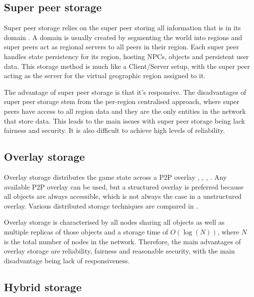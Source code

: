 \documentclass[10pt,a4paper,conference]{IEEEtran}
\begin{document}
\subsection{Super peer storage}

Super peer storage relies on the super peer storing all information that is in its domain \cite{knutsson_p2p_first}. A domain is usually created by
segmenting the world into regions and super peers act as regional servers to all peers in their region. Each super peer handles state persistency for
its region, hosting NPCs, objects and persistent user data. This storage method is much like a Client/Server setup, with the super peer acting as the
server for the virtual geographic region assigned to it.

The advantage of super peer storage is that it's responsive. The disadvantages of super peer storage stem from the per-region centralised approach,
where super peers have access to all region data and they are the only entities in the network that store data. This leads to the main issues with
super peer storage being lack fairness and security. It is also difficult to achieve high levels of reliability.


\subsection{Overlay storage}

Overlay storage distributes the game state across a P2P overlay \cite{Douglas05enablingmassively}, \cite{using_freenet_storage}, \cite{Fan_phd},
\cite{past_storage_focus}. Any available P2P overlay can be used, but a structured overlay is preferred because all objects are always accessible,
which is not always the case in a unstructured overlay. Various distributed storage techniques are compared in
\cite{Hasan_distributed_storage_survey}.

Overlay storage is characterised by all nodes sharing all objects as well as multiple replicas of those objects and a storage time of $O(\log(N))$,
where $N$ is the total number of nodes in the network. Therefore, the main advantages of overlay storage are reliability, fairness and reasonable
security, with the main disadvantage being lack of responsiveness.

\subsection{Hybrid storage}
\end{document}
